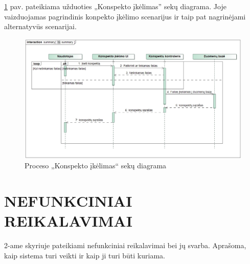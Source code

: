 \documentclass{VUMIFPSkursinis}
\begin{document}
\ref{fig:summary} pav. pateikiama užduoties „Konspekto įkėlimas” sekų diagrama. Joje vaizduojamas pagrindinis konpekto įkėlimo scenarijus ir taip pat nagrinėjami alternatyvūs scenarijai.
\begin{figure}[H]
	\centering
	\includegraphics[width=\linewidth]{img/summary.jpg}
	\caption{Proceso „Konspekto įkėlimas“ sekų diagrama}
	\label{fig:summary}
\end{figure}
\newpage

\section{NEFUNKCINIAI REIKALAVIMAI}
2-ame skyriuje pateikiami nefunkciniai reikalavimai bei jų svarba. Aprašoma, kaip sistema turi veikti ir kaip ji turi būti kuriama.
\end{document}
